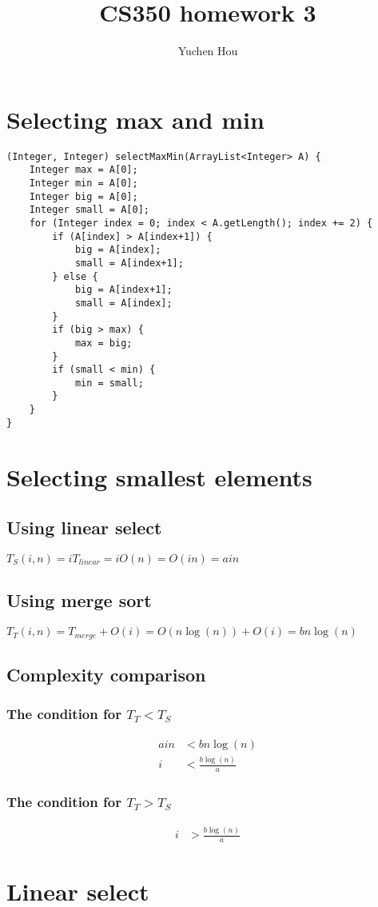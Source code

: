 \documentclass{article}
\begin{document}
\lstset{language=Java}
\title{CS350 homework 3}
\author{Yuchen Hou}
\maketitle
\section{Selecting max and min}
\begin{lstlisting}
(Integer, Integer) selectMaxMin(ArrayList<Integer> A) {
	Integer max = A[0];
	Integer min = A[0];
	Integer big = A[0];
	Integer small = A[0];
	for (Integer index = 0; index < A.getLength(); index += 2) {
		if (A[index] > A[index+1]) {
			big = A[index];
			small = A[index+1];
		} else {
			big = A[index+1];
			small = A[index];
		}
		if (big > max) {
			max = big;
		}
		if (small < min) {
			min = small;
		}
	}
}
\end{lstlisting}
\section{Selecting smallest elements}
\subsection{Using linear select}
$T_S(i, n) = i T_{linear} = i O(n) = O(in) = a i n$
\subsection{Using merge sort}
$T_T(i, n) = T_{merge} + O(i) = O(n \log (n)) + O(i) = b n \log(n)$
\subsection{Complexity comparison}
\subsubsection{The condition for $T_T < T_S$}
\begin{align*}
ain &< b n \log(n)\\
i &< \frac{b\log(n)}{a}
\end{align*}
\subsubsection{The condition for $T_T > T_S$}
\begin{align*}
i &> \frac{b\log(n)}{a}
\end{align*}
\section{Linear select}
\end{document}
